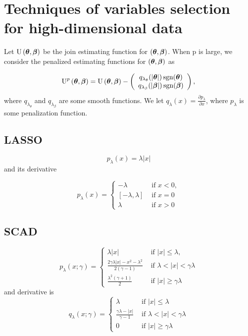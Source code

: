 \documentclass[
  letterpaper,
  DIV=11,
  numbers=noendperiod]{scrreprt}
\begin{document}

\hypertarget{techniques-of-variables-selection-for-high-dimensional-data}{%
\chapter{Techniques of variables selection for high-dimensional
data}\label{techniques-of-variables-selection-for-high-dimensional-data}}

Let \(\operatorname{U}\left(\boldsymbol{\theta}, \boldsymbol{\beta}\right)\) be the join
estimating function for \(\left(\boldsymbol{\theta}, \boldsymbol{\beta}\right)\). When p is
large, we consider the penalized estimating functions for
\(\left(\boldsymbol{\theta}, \boldsymbol{\beta}\right)\) as

\[
\operatorname{U}^p\left(\boldsymbol{\theta}, \boldsymbol{\beta}\right) = \operatorname{U}\left(\boldsymbol{\theta}, \boldsymbol{\beta}\right) -\left(\begin{array}{c}
q_{\lambda_\theta}(|\boldsymbol{\theta}|) \operatorname{sgn}(\boldsymbol{\theta}) \\
q_{\lambda_\beta}(|\boldsymbol{\beta}|) \operatorname{sgn}(\boldsymbol{\beta})
\end{array}\right),
\] where \(q_{\lambda_{\theta}}\) and \(q_{\lambda_{\beta}}\) are some
smooth functions. We let
\(q_{\lambda}\left(x\right) = \frac{\partial p_{\lambda}}{\partial x}\),
where \(p_{\lambda}\) is some penalization function.

\hypertarget{lasso}{%
\section{LASSO}\label{lasso}}

\[
p_{\lambda}(x) = \lambda |x|
\] and its derivative

\[
p_{\lambda}(x)= \begin{cases} - \lambda & \text { if }x < 0, \\ \left[-\lambda, \lambda\right] & \text { if } x = 0 \\ \lambda & \text { if }x > 0\end{cases}
\]

\hypertarget{scad}{%
\section{SCAD}\label{scad}}

\[
p_{\lambda}(x ; \gamma)= \begin{cases}\lambda|x| & \text { if }|x| \leq \lambda, \\ \frac{2 \gamma \lambda|x|-x^2-\lambda^2}{2(\gamma-1)} & \text { if } \lambda<|x|<\gamma \lambda \\ \frac{\lambda^2(\gamma+1)}{2} & \text { if }|x| \geq \gamma \lambda\end{cases}
\] and derivative is \[
q_{\lambda}(x ;  \gamma)= \begin{cases}\lambda & \text { if }|x| \leq \lambda \\ \frac{\gamma \lambda-|x|}{\gamma-1} & \text { if } \lambda<|x|<\gamma \lambda \\ 0 & \text { if }|x| \geq \gamma \lambda\end{cases}
\]
\end{document}
